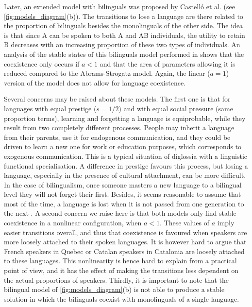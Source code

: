 \documentclass[../thesis.tex]{subfiles}
\begin{document}
Later, an extended model with bilinguals was proposed by Castell\'o et al.
\cite{CastelloOrderingDynamics2006} (see \cref{fig:models_diagram}(b)). The transitions
to lose a language are there related to the proportion of bilinguals besides the
monolinguals of the other side. The idea is that since A can be spoken to both A and AB
individuals, the utility to retain B decreases with an increasing proportion of these
two types of individuals. An analysis of the stable states of this bilinguals model
performed in \cite{VazquezAgentBased2010} shows that the coexistence only occurs if $a <
1$ and that the area of parameters allowing it is reduced compared to the
Abrams-Strogatz model. Again, the linear ($a = 1$) version of the model does not allow
for language coexistence.

Several concerns may be raised about these models. The first one is that for languages
with equal prestige ($s = 1/2$) and with equal social pressure (same proportion terms),
learning and forgetting a language is equiprobable, while they result from two
completely different processes. People may inherit a language from their parents, use it
for endogenous communication, and they could be driven to learn a new one for work or
education purposes, which corresponds to exogenous communication. This is a typical
situation of diglossia \cite{FergusonDiglossia1959} with a linguistic functional
specialisation. A difference in prestige favours this process, but losing a language,
especially in the presence of cultural attachment, can be more difficult. In the case of
bilingualism, once someone masters a new language to a bilingual level they will not
forget their first. Besides, it seems reasonable to assume that most of the time, a
language is lost when it is not passed from one generation to the next
\cite{CrystalLanguageDeath2000,PortesPluribusUnum1998}. A second concern we raise here
is that both models only find stable coexistence in a nonlinear configuration, when $a <
1$. These values of $a$ imply easier transitions overall, and thus that coexistence is
favoured when speakers are more loosely attached to their spoken languages. It is
however hard to argue that French speakers in Quebec or Catalan speakers in Catalonia
are loosely attached to these languages. This nonlinearity is hence hard to explain from
a practical point of view, and it has the effect of making the transitions less
dependent on the actual proportions of speakers. Thirdly, it is important to note that
the bilingual model of \cref{fig:models_diagram}(b) is not able to produce a stable
solution in which the bilinguals coexist with monolinguals of a single language.
\end{document}
